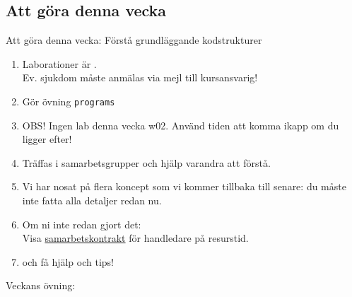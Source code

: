 \subsection{Att göra denna vecka}
\begin{Slide}{Att göra denna vecka: Förstå grundläggande kodstrukturer}

\begin{enumerate}
\item Laborationer är .\\ Ev. sjukdom måste anmälas  via mejl till kursansvarig!
\item Gör övning \texttt{programs}
\item OBS! Ingen lab denna vecka w02. Använd tiden att komma ikapp om du ligger efter!
\item Träffas i samarbetsgrupper och hjälp varandra att förstå.
\item Vi har nosat på flera koncept som vi kommer tillbaka till senare: du måste inte fatta alla detaljer redan nu.
\item Om ni inte redan gjort det: \\Visa \href{https://github.com/bjornregnell/lth-eda016-2015/tree/master/assignments}{samarbetskontrakt} för handledare på resurstid.
\item {} och få hjälp och tips!
\end{enumerate}
\end{Slide}

\begin{Slide}{Veckans övning: \texttt{\ExeWeekTWO}}\SlideFontTiny
\vspace{-0.5em}
\setlength{\leftmargini}{0pt}
\begin{itemize}

\end{itemize}
\end{Slide}

